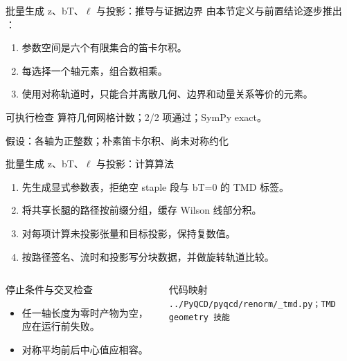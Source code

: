 \begin{frame}[t]{批量生成 z、bT、\ensuremath{\ell} 与投影：推导与证据边界}
\footnotesize
{}\quad 由本节定义与前置结论逐步推出 ：
\begin{enumerate}
\item 参数空间是六个有限集合的笛卡尔积。
\item 每选择一个轴元素，组合数相乘。
\item 使用对称轨道时，只能合并离散几何、边界和动量关系等价的元素。
\end{enumerate}\begin{block}{可执行检查}
\quad 算符几何网格计数；2/2 项通过；SymPy exact。
\par\scriptsize 假设：各轴为正整数；朴素笛卡尔积、尚未对称约化
\end{block}
\end{frame}

\begin{frame}[t]{批量生成 z、bT、\ensuremath{\ell} 与投影：计算算法}
\footnotesize
{}\begin{enumerate}
\item 先生成显式参数表，拒绝空 staple 段与 bT=0 的 TMD 标签。
\item 将共享长腿的路径按前缀分组，缓存 Wilson 线部分积。
\item 对每项计算未投影张量和目标投影，保持复数值。
\item 按路径签名、流时和投影写分块数据，并做旋转轨道比较。
\end{enumerate}\begin{columns}[T,onlytextwidth]
\begin{block}{停止条件与交叉检查}\scriptsize\begin{itemize}
\item[\CheckMark] 任一轴长度为零时产物为空，应在运行前失败。
\item[\CheckMark] 对称平均前后中心值应相容。
\end{itemize}\end{block}
\begin{block}{代码映射}
\scriptsize \texttt{.\allowbreak{}.\allowbreak{}/\allowbreak{}PyQCD/\allowbreak{}pyqcd/\allowbreak{}renorm/\allowbreak{}\_\allowbreak{}tmd.\allowbreak{}py；TMD geometry 技能}
\end{block}\end{columns}\end{frame}

